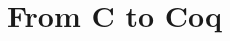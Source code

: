 \documentclass[8pt,aspectratio=169]{beamer}
\begin{document}




\section{From C to Coq}

%
%



\end{document}
